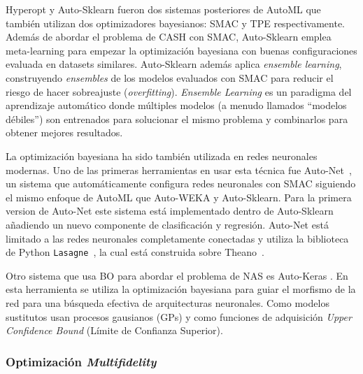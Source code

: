 Hyperopt \cite{bergstra2013hyperopt} y Auto-Sklearn \cite{fuerer2015efficient} fueron dos sistemas posteriores de AutoML que también utilizan dos optimizadores bayesianos: SMAC y TPE respectivamente. Además de abordar el problema de CASH con SMAC, Auto-Sklearn emplea meta-learning para empezar la optimización bayesiana con buenas configuraciones \cite{fuerer2015initializing} evaluada en datasets similares. Auto-Sklearn además aplica \textit{ensemble learning}, construyendo \textit{ensembles} de los modelos evaluados con SMAC \cite{hutter2011sequential} para reducir el riesgo de hacer sobreajuste (\textit{overfitting}). \textit{Ensemble Learning} es un paradigma del aprendizaje automático donde múltiples modelos (a menudo llamados ``modelos débiles'') son entrenados para solucionar el mismo problema y combinarlos para obtener mejores resultados.

La optimización bayesiana ha sido también utilizada en redes neuronales modernas. Uno de las primeras herramientas en usar esta técnica fue Auto-Net~\cite{mendoza2016towards}, un sistema que automáticamente configura redes neuronales con SMAC siguiendo el mismo enfoque de AutoML que Auto-WEKA y Auto-Sklearn. Para la primera version de Auto-Net este sistema está implementado dentro de Auto-Sklearn añadiendo un nuevo componente de clasificación y regresión. Auto-Net está limitado a las redes neuronales completamente conectadas y utiliza la biblioteca de Python \texttt{Lasagne}~\cite{lasagne}, la cual está construida sobre Theano~\cite{theano2016theano}.

Otro sistema que usa BO para abordar el problema de NAS es Auto-Keras \cite{jin2019auto}. En esta herramienta se utiliza la optimización bayesiana para guiar el morfismo de la red para una búsqueda efectiva de arquitecturas neuronales. Como modelos sustitutos usan procesos gausianos (GPs) y como funciones de adquisición \textit{Upper Confidence Bound} (Límite de Confianza Superior).

\subsubsection{Optimización \textit{Multifidelity}}



